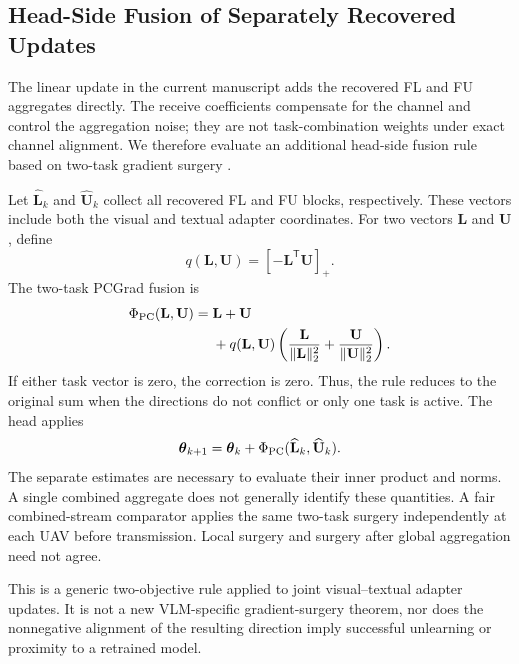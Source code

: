 
\subsection{Head-Side Fusion of Separately Recovered Updates}

The linear update in the current manuscript adds the recovered FL and FU
aggregates directly. The receive coefficients compensate for the channel
and control the aggregation noise; they are not task-combination weights
under exact channel alignment. We therefore evaluate an additional
head-side fusion rule based on two-task gradient surgery
\cite{Yu_NeurIPS_2020_PCGrad}.

Let $\widehat{\mathbf L}_k$ and $\widehat{\mathbf U}_k$ collect all
recovered FL and FU blocks, respectively. These vectors include both the
visual and textual adapter coordinates. For two vectors $\mathbf L$
and $\mathbf U$, define
\begin{equation}
q(\mathbf L,\mathbf U)=[-\mathbf L^{\mathsf T}\mathbf U]_+.
\end{equation}
The two-task PCGrad fusion is
\begin{equation}
\begin{aligned}
\Phi_{\rm PC}(\mathbf L,\mathbf U)
={}&\mathbf L+\mathbf U\\
&+q(\mathbf L,\mathbf U)
\left(\frac{\mathbf L}{\|\mathbf L\|_2^2}
+\frac{\mathbf U}{\|\mathbf U\|_2^2}\right).
\end{aligned}
\end{equation}
If either task vector is zero, the correction is zero. Thus, the rule
reduces to the original sum when the directions do not conflict or only
one task is active. The head applies
\begin{equation}
\boldsymbol\theta_{k+1}=\boldsymbol\theta_k+
\Phi_{\rm PC}(\widehat{\mathbf L}_k,\widehat{\mathbf U}_k).
\end{equation}
The separate estimates are necessary to evaluate their inner product
and norms. A single combined aggregate does not generally identify
these quantities. A fair combined-stream comparator applies the same
two-task surgery independently at each UAV before transmission. Local
surgery and surgery after global aggregation need not agree.

This is a generic two-objective rule applied to joint visual--textual
adapter updates. It is not a new VLM-specific gradient-surgery theorem,
nor does the nonnegative alignment of the resulting direction imply
successful unlearning or proximity to a retrained model.

